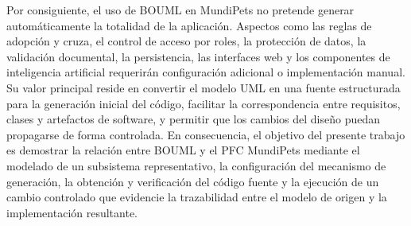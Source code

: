 \documentclass{article}
\begin{document}
Por consiguiente, el uso de BOUML en MundiPets no pretende generar automáticamente la totalidad de la aplicación. Aspectos como las reglas de adopción y cruza, el control de acceso por roles, la protección de datos, la validación documental, la persistencia, las interfaces web y los componentes de inteligencia artificial requerirán configuración adicional o implementación manual. Su valor principal reside en convertir el modelo UML en una fuente estructurada para la generación inicial del código, facilitar la correspondencia entre requisitos, clases y artefactos de software, y permitir que los cambios del diseño puedan propagarse de forma controlada. En consecuencia, el objetivo del presente trabajo es demostrar la relación entre BOUML y el PFC MundiPets mediante el modelado de un subsistema representativo, la configuración del mecanismo de generación, la obtención y verificación del código fuente y la ejecución de un cambio controlado que evidencie la trazabilidad entre el modelo de origen y la implementación resultante.



\end{document}
